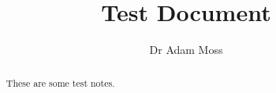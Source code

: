 \documentclass{nottsnotes}
\author{Dr Adam Moss}
\title{Test Document}
\begin{document}
\begin{abstract}
These are some test notes.
\end{abstract}


\begingroup
\let\cleardoublepage\relax
{}
\newpage
\newpage
\onecolumn

%

\newpage

%

\endgroup
{}








\end{document}

